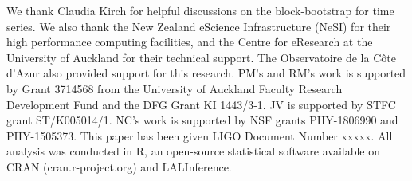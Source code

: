 \documentclass[aps,reprint,amsmath,amssymb,showpacs,showkeys]{revtex4-1}%
\newcommand{\cb}{ \color{blue}}
\begin{document}

\begin{acknowledgements}
  We thank Claudia Kirch for helpful discussions on the block-bootstrap for time series.  We also thank the New Zealand eScience Infrastructure (NeSI) for their high performance computing facilities, and the Centre for eResearch at the University of Auckland for their technical support. The Observatoire de la C\^{o}te d'Azur also provided support for this research. PM's and RM's work is supported by Grant 3714568 from the University of Auckland Faculty Research Development Fund and the DFG Grant KI 1443/3-1. JV is supported by STFC grant ST/K005014/1. NC's work is supported by NSF grants PHY-1806990 and PHY-1505373. This paper has been given LIGO Document Number xxxxx.  All analysis was conducted in \textsf{R}, an open-source statistical software available on \textsf{CRAN} (cran.r-project.org) and LALInference.
\end{acknowledgements}
\pagebreak






\end{document}

